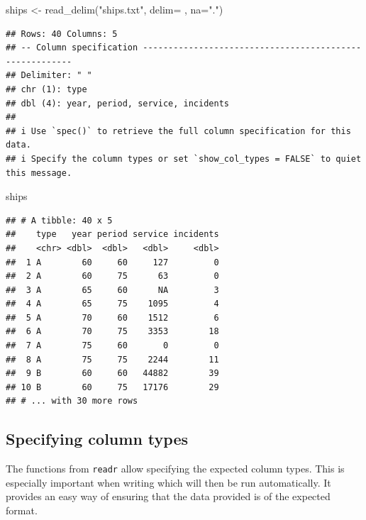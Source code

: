 \documentclass[
]{book}
\newenvironment{Shaded}{\begin{snugshade}}{\end{snugshade}}
\newcommand{\AttributeTok}[1]{\textcolor[rgb]{0.77,0.63,0.00}{#1}}
\newcommand{\FunctionTok}[1]{\textcolor[rgb]{0.00,0.00,0.00}{#1}}
\newcommand{\NormalTok}[1]{#1}
\newcommand{\OtherTok}[1]{\textcolor[rgb]{0.56,0.35,0.01}{#1}}
\newcommand{\StringTok}[1]{\textcolor[rgb]{0.31,0.60,0.02}{#1}}
\begin{document}
\begin{Shaded}
\begin{Highlighting}[]
\NormalTok{ships }\OtherTok{\textless{}{-}} \FunctionTok{read\_delim}\NormalTok{(}\StringTok{"ships.txt"}\NormalTok{, }\AttributeTok{delim=}\StringTok{\textquotesingle{} \textquotesingle{}}\NormalTok{ , }\AttributeTok{na=}\StringTok{"."}\NormalTok{)}
\end{Highlighting}
\end{Shaded}

\begin{verbatim}
## Rows: 40 Columns: 5
## -- Column specification --------------------------------------------------------
## Delimiter: " "
## chr (1): type
## dbl (4): year, period, service, incidents
## 
## i Use `spec()` to retrieve the full column specification for this data.
## i Specify the column types or set `show_col_types = FALSE` to quiet this message.
\end{verbatim}

\begin{Shaded}
\begin{Highlighting}[]
\NormalTok{ships}
\end{Highlighting}
\end{Shaded}

\begin{verbatim}
## # A tibble: 40 x 5
##    type   year period service incidents
##    <chr> <dbl>  <dbl>   <dbl>     <dbl>
##  1 A        60     60     127         0
##  2 A        60     75      63         0
##  3 A        65     60      NA         3
##  4 A        65     75    1095         4
##  5 A        70     60    1512         6
##  6 A        70     75    3353        18
##  7 A        75     60       0         0
##  8 A        75     75    2244        11
##  9 B        60     60   44882        39
## 10 B        60     75   17176        29
## # ... with 30 more rows
\end{verbatim}

\hypertarget{specifying-column-types}{%
\subsection{Specifying column types}\label{specifying-column-types}}

The functions from \texttt{readr} allow specifying the expected column types. This is especially important when writing which will then be run automatically. It provides an easy way of ensuring that the data provided is of the expected format.
\end{document}

